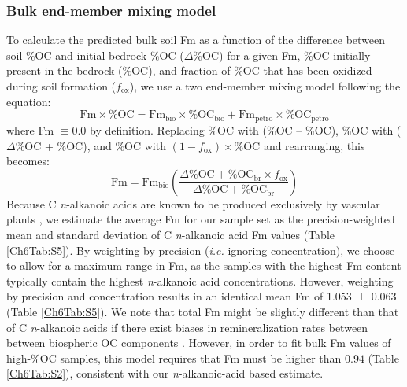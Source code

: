 \subsubsection{Bulk end-member mixing model}\label{Ch6SD3}

To calculate the predicted bulk soil Fm as a function of the difference between soil \%OC and initial bedrock \%OC ($\Delta$\%OC) for a given Fm, \%OC initially present in the bedrock (\%OC), and fraction of \%OC that has been oxidized during soil formation ($f_{\text{ox}}$), we use a two end-member mixing model following the equation:
%
\begin{equation}\label{Ch6Eq:4}
	\text{Fm}\times \text{\%OC} = \text{Fm}_{\text{bio}}\times \text{\%OC}_{\text{bio}} + \text{Fm}_{\text{petro}}\times \text{\%OC}_{\text{petro}}
\end{equation}
%
where Fm $\equiv 0.0$ by definition. Replacing \%OC with (\%OC -- \%OC), \%OC with ($\Delta$\%OC + \%OC), and \%OC with $(1 - f_{\text{ox}})\times$\%OC and rearranging, this becomes: 
%
\begin{equation}\label{Ch6Eq:5}
	\text{Fm} = \text{Fm}_{\text{bio}} \left( \frac{\Delta \text{\%OC} + \text{\%OC}_{\text{br}} \times f_{\text{ox}}}{\Delta \text{\%OC} + \text{\%OC}_{\text{br}}} \right)
\end{equation}
%
Because C \textit{n}-alkanoic acids are known to be produced exclusively by vascular plants \citep[see][for review]{Eglinton:2008hs}, we estimate the average Fm for our sample set as the precision-weighted mean and standard deviation of C \textit{n}-alkanoic acid Fm values (Table \ref{Ch6Tab:S5}). By weighting by precision (\textit{i.e.} ignoring concentration), we choose to allow for a maximum range in Fm, as the samples with the highest Fm content typically contain the highest \textit{n}-alkanoic acid concentrations. However, weighting by precision and concentration results in an identical mean Fm of \num{1.053 \pm 0.063} (Table \ref{Ch6Tab:S5}). We note that total Fm might be slightly different than that of C \textit{n}-alkanoic acids if there exist biases in remineralization rates between between biospheric OC components \citep[\textit{e.g.}][]{Cranwell:1981vg,Meyers:1993vwa}. However, in order to fit bulk Fm values of high-\%OC samples, this model requires that Fm must be higher than $0.94$ (Table \ref{Ch6Tab:S2}), consistent with our \textit{n}-alkanoic-acid based estimate.

